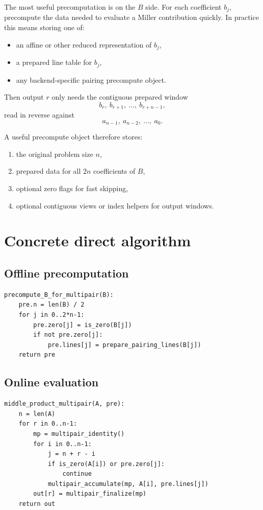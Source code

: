 \documentclass[11pt]{article}
\begin{document}
The most useful precomputation is on the $B$ side.
For each coefficient $b_j$, precompute the data needed to evaluate a Miller
contribution quickly.
In practice this means storing one of:
\begin{itemize}[itemsep=0.3em, topsep=0.4em]
  \item an affine or other reduced representation of $b_j$,
  \item a prepared line table for $b_j$,
  \item any backend-specific pairing precompute object.
\end{itemize}

Then output $r$ only needs the contiguous prepared window
\[
b_r,\ b_{r+1},\ \dots,\ b_{r+n-1},
\]
read in reverse against
\[
a_{n-1},\ a_{n-2},\ \dots,\ a_0.
\]

A useful precompute object therefore stores:
\begin{enumerate}[itemsep=0.3em, topsep=0.4em]
  \item the original problem size $n$,
  \item prepared data for all $2n$ coefficients of $B$,
  \item optional zero flags for fast skipping,
  \item optional contiguous views or index helpers for output windows.
\end{enumerate}

\section{Concrete direct algorithm}

\subsection{Offline precomputation}

\begin{lstlisting}
precompute_B_for_multipair(B):
    pre.n = len(B) / 2
    for j in 0..2*n-1:
        pre.zero[j] = is_zero(B[j])
        if not pre.zero[j]:
            pre.lines[j] = prepare_pairing_lines(B[j])
    return pre
\end{lstlisting}

\subsection{Online evaluation}

\begin{lstlisting}
middle_product_multipair(A, pre):
    n = len(A)
    for r in 0..n-1:
        mp = multipair_identity()
        for i in 0..n-1:
            j = n + r - i
            if is_zero(A[i]) or pre.zero[j]:
                continue
            multipair_accumulate(mp, A[i], pre.lines[j])
        out[r] = multipair_finalize(mp)
    return out
\end{lstlisting}
\end{document}
